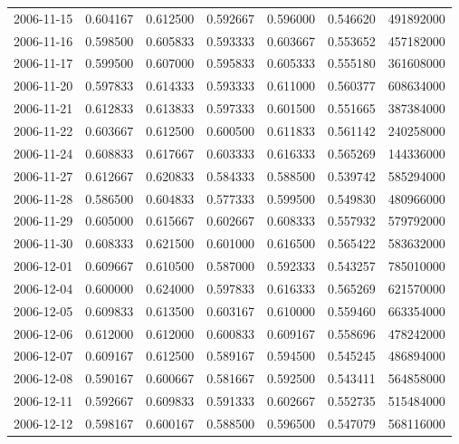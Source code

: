 \begin{tabular}{lrrrrrr}
2006-11-15 &    0.604167 &    0.612500 &    0.592667 &    0.596000 &    0.546620 &   491892000 \\
2006-11-16 &    0.598500 &    0.605833 &    0.593333 &    0.603667 &    0.553652 &   457182000 \\
2006-11-17 &    0.599500 &    0.607000 &    0.595833 &    0.605333 &    0.555180 &   361608000 \\
2006-11-20 &    0.597833 &    0.614333 &    0.593333 &    0.611000 &    0.560377 &   608634000 \\
2006-11-21 &    0.612833 &    0.613833 &    0.597333 &    0.601500 &    0.551665 &   387384000 \\
2006-11-22 &    0.603667 &    0.612500 &    0.600500 &    0.611833 &    0.561142 &   240258000 \\
2006-11-24 &    0.608833 &    0.617667 &    0.603333 &    0.616333 &    0.565269 &   144336000 \\
2006-11-27 &    0.612667 &    0.620833 &    0.584333 &    0.588500 &    0.539742 &   585294000 \\
2006-11-28 &    0.586500 &    0.604833 &    0.577333 &    0.599500 &    0.549830 &   480966000 \\
2006-11-29 &    0.605000 &    0.615667 &    0.602667 &    0.608333 &    0.557932 &   579792000 \\
2006-11-30 &    0.608333 &    0.621500 &    0.601000 &    0.616500 &    0.565422 &   583632000 \\
2006-12-01 &    0.609667 &    0.610500 &    0.587000 &    0.592333 &    0.543257 &   785010000 \\
2006-12-04 &    0.600000 &    0.624000 &    0.597833 &    0.616333 &    0.565269 &   621570000 \\
2006-12-05 &    0.609833 &    0.613500 &    0.603167 &    0.610000 &    0.559460 &   663354000 \\
2006-12-06 &    0.612000 &    0.612000 &    0.600833 &    0.609167 &    0.558696 &   478242000 \\
2006-12-07 &    0.609167 &    0.612500 &    0.589167 &    0.594500 &    0.545245 &   486894000 \\
2006-12-08 &    0.590167 &    0.600667 &    0.581667 &    0.592500 &    0.543411 &   564858000 \\
2006-12-11 &    0.592667 &    0.609833 &    0.591333 &    0.602667 &    0.552735 &   515484000 \\
2006-12-12 &    0.598167 &    0.600167 &    0.588500 &    0.596500 &    0.547079 &   568116000 \\

\end{tabular}
